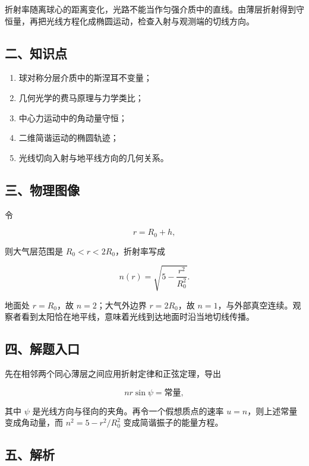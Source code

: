 \documentclass[12pt,a4paper,UTF8]{ctexart}
\newcommand{\tightlist}{\setlength{\itemsep}{0pt}\setlength{\parskip}{0pt}}
\begin{document}
折射率随离球心的距离变化，光路不能当作匀强介质中的直线。由薄层折射得到守恒量，再把光线方程化成椭圆运动，检查入射与观测端的切线方向。

\subsection{二、知识点}\label{ux4e8cux77e5ux8bc6ux70b9-5}

\begin{enumerate}
\def\labelenumi{\arabic{enumi}.}
\tightlist
\item
  球对称分层介质中的斯涅耳不变量；
\item
  几何光学的费马原理与力学类比；
\item
  中心力运动中的角动量守恒；
\item
  二维简谐运动的椭圆轨迹；
\item
  光线切向入射与地平线方向的几何关系。
\end{enumerate}

\subsection{三、物理图像}\label{ux4e09ux7269ux7406ux56feux50cf-5}

令

\[
r=R_0+h,
\]

则大气层范围是 \(R_0<r<2R_0\)，折射率写成

\[
n(r)=\sqrt{5-\frac{r^2}{R_0^2}}.
\]

地面处 \(r=R_0\)，故 \(n=2\)；大气外边界 \(r=2R_0\)，故
\(n=1\)，与外部真空连续。观察者看到太阳恰在地平线，意味着光线到达地面时沿当地切线传播。

\subsection{四、解题入口}\label{ux56dbux89e3ux9898ux5165ux53e3-5}

先在相邻两个同心薄层之间应用折射定律和正弦定理，导出

\[
nr\sin\psi=\text{常量},
\]

其中 \(\psi\) 是光线方向与径向的夹角。再令一个假想质点的速率
\(u=n\)，则上述常量变成角动量，而 \(n^2=5-r^2/R_0^2\)
变成简谐振子的能量方程。

\subsection{五、解析}\label{ux4e94ux89e3ux6790-5}
\end{document}
